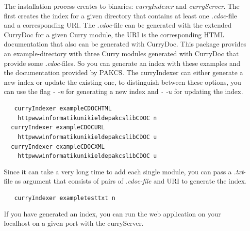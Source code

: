 \documentclass[%
	latex,%
	a4paper,%
	oneside,%
	chapterprefix,%
	headsepline,%
	12pt%
]{scrbook}
\begin{document}
The installation process creates to binaries: \emph{curryIndexer} and
\emph{curryServer}. %
The first creates the index for a given directory that contains at
least one \emph{.cdoc}-file and a corresponding URI. %
The \emph{.cdoc}-file can be generated with the extended CurryDoc for
a given Curry module, the URI is the corresponding HTML documentation
that also can be generated with CurryDoc. %
This package provides an example-directory with three Curry modules
generated with CurryDoc that provide some \emph{.cdoc}-files. %
So you can generate an index with these examples and the documentation
provided by PAKCS. %
The curryIndexer can either generate a new index or update the
existing one, to distinguish between these options, you can use the
flag \emph{- -n} for generating a new index and \emph{- -u} for
updating the index.

\begin{tabbing}\tt
~~curryIndexer~exampleCDOCHTML~\\
\tt ~~~~httpwwwinformatikunikieldepakcslibCDOC~n\\
\tt ~~curryIndexer~exampleCDOCURL~\\
\tt ~~~~httpwwwinformatikunikieldepakcslibCDOC~u\\
\tt ~~curryIndexer~exampleCDOCXML~\\
\tt ~~~~httpwwwinformatikunikieldepakcslibCDOC~u
\end{tabbing}

Since it can take a very long time to add each single module, you can
pass a \emph{.txt}-file as argument that consists of pairs of \emph{.cdoc-file} and
URI to generate the index.

\begin{tabbing}\tt
~~curryIndexer~exampletesttxt~n
\end{tabbing}

If you have generated an index, you can run the web application on your
localhost on a given port with the curryServer.
\end{document}
